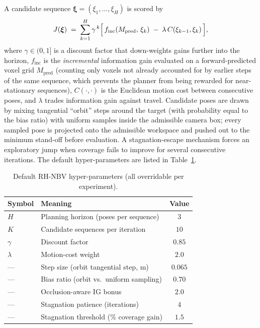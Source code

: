A candidate sequence
$\boldsymbol{\xi}=(\xi_1,\dots,\xi_H)$ is scored by
\begin{equation}
  J(\boldsymbol{\xi})
  \;=\;
  \sum_{k=1}^{H}
  \gamma^{\,k}
  \Bigl[\,
    f_{\mathrm{inc}}\!\left(M_{\mathrm{pred}},\,\xi_k\right)
    \;-\;
    \lambda\,C(\xi_{k-1},\xi_k)
  \,\Bigr],
  \label{eq:rh-objective}
\end{equation}
where $\gamma\in(0,1]$ is a discount factor that down-weights gains further
into the horizon, $f_{\mathrm{inc}}$ is the \emph{incremental}
information gain evaluated on a forward-predicted voxel grid
$M_{\mathrm{pred}}$ (counting only voxels not already accounted for by
earlier steps of the same sequence, which prevents the planner from being
rewarded for near-stationary sequences), $C(\cdot,\cdot)$ is the Euclidean
motion cost between consecutive poses, and $\lambda$ trades information gain
against travel. Candidate poses are drawn by mixing tangential ``orbit''
steps around the target (with probability equal to the bias ratio) with
uniform samples inside the admissible camera box; every sampled pose is
projected onto the admissible workspace and pushed out to the minimum
stand-off before evaluation. A stagnation-escape mechanism forces an
exploratory jump when coverage fails to improve for several consecutive
iterations. The default hyper-parameters are listed in
Table~\ref{tab:rh-params}.

\begin{table}[t]
  \centering
  \caption{Default RH-NBV hyper-parameters (all overridable per experiment).}
  \label{tab:rh-params}
  \begin{tabular}{@{}llc@{}}
    \toprule
    Symbol & Meaning & Value \\
    \midrule
    $H$        & Planning horizon (poses per sequence)      & $3$ \\
    $K$        & Candidate sequences per iteration          & $10$ \\
    $\gamma$   & Discount factor                            & $0.85$ \\
    $\lambda$  & Motion-cost weight                         & $2.0$ \\
    ---        & Step size (orbit tangential step, m)       & $0.065$ \\
    ---        & Bias ratio (orbit vs.\ uniform sampling)   & $0.70$ \\
    ---        & Occlusion-aware IG bonus                    & $2.0$ \\
    ---        & Stagnation patience (iterations)           & $4$ \\
    ---        & Stagnation threshold (\% coverage gain)    & $1.5$ \\
    \bottomrule
  \end{tabular}
\end{table}

